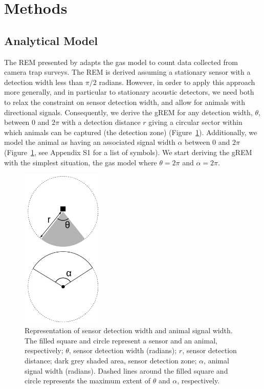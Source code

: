 \section{Methods}

\subsection{Analytical Model}

The REM presented by \cite{rowcliffe2008estimating} adapts the gas model to count data collected from camera trap surveys.
The REM is derived assuming a stationary sensor with a detection width less than $\pi/2$ radians.
However, in order to apply this approach more generally, and in particular to stationary acoustic detectors, we need both to relax the constraint on sensor detection width, and allow for animals with directional signals.
Consequently, we derive the gREM for any detection width, $ \theta$, between 0 and $2\pi$ with a detection distance $r$ giving a circular sector within which animals can be captured (the detection zone) (Figure~\ref{f:AngleDef}).
Additionally, we model the animal as having an associated signal width $\alpha$ between 0 and $2\pi$  (Figure~\ref{f:AngleDef}, see Appendix S1 for a list of symbols).
We start deriving the gREM with the simplest situation, the gas model where $\theta =  2\pi$ and $ \alpha =  2\pi$. 


\begin{figure}[t]
        \centering
	\includegraphics[width=4cm]{imgs/lucas_et_al_figure1.pdf}

\caption[Representation of sensor detection width and animal signal width]{
Representation of sensor detection width and animal signal width.
The filled square and circle represent a sensor and an animal, respectively; $\theta$, sensor detection width (radians); $r$, sensor detection distance; dark grey shaded area, sensor detection zone; $\alpha$, animal signal width (radians).
Dashed lines around the filled square and circle represents the maximum extent of $\theta$ and $\alpha$, respectively.} 
\label{f:AngleDef}
\end{figure}



